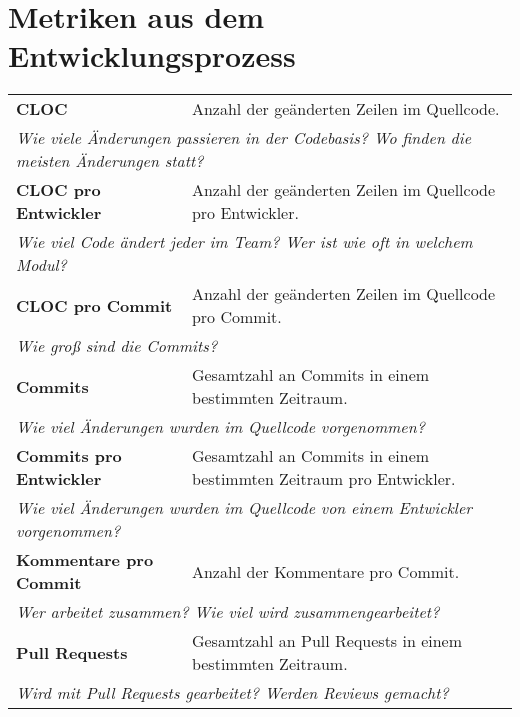 \appendix
{}

\section{Metriken aus dem Entwicklungsprozess}\label{appendix:metrics}

\begin{table}[H]
    \centering
    \begin{tabular}{p{6.5cm}p{8cm}} \toprule
    \textbf{\ac{CLOC}} & Anzahl der geänderten Zeilen im Quellcode. \\
    \multicolumn{2}{p{14.5cm}}{\textit{Wie viele Änderungen passieren in der Codebasis? \newline Wo finden die meisten Änderungen statt?}} \\ \midrule
    \textbf{\ac{CLOC} pro Entwickler} & Anzahl der geänderten Zeilen im Quellcode pro Entwickler. \\ 
    \multicolumn{2}{p{14.5cm}}{\textit{Wie viel Code ändert jeder im Team? \newline  Wer ist wie oft in welchem Modul?}} \\ \midrule
    \textbf{\ac{CLOC} pro Commit} & Anzahl der geänderten Zeilen im Quellcode pro Commit. \\ 
    \multicolumn{2}{p{14.5cm}}{\textit{Wie groß sind die Commits?}} \\ \midrule
    \textbf{Commits} & Gesamtzahl an Commits in einem bestimmten Zeitraum. \\ 
    \multicolumn{2}{p{14.5cm}}{\textit{Wie viel Änderungen wurden im Quellcode vorgenommen?}} \\ \midrule
    \textbf{Commits pro Entwickler} & Gesamtzahl an Commits in einem bestimmten Zeitraum pro Entwickler. \\ 
    \multicolumn{2}{p{14.5cm}}{\textit{Wie viel Änderungen wurden im Quellcode von einem Entwickler vorgenommen?}} \\ \midrule
    \textbf{Kommentare pro Commit} & Anzahl der Kommentare pro Commit. \\ 
    \multicolumn{2}{p{14.5cm}}{\textit{Wer arbeitet zusammen? \newline Wie viel wird zusammengearbeitet?}} \\ \midrule
    \textbf{Pull Requests} & Gesamtzahl an Pull Requests in einem bestimmten Zeitraum. \\ 
    \multicolumn{2}{p{14.5cm}}{\textit{Wird mit Pull Requests gearbeitet? \newline Werden Reviews gemacht?}} \\ \midrule

\end{tabular}
\end{table}

